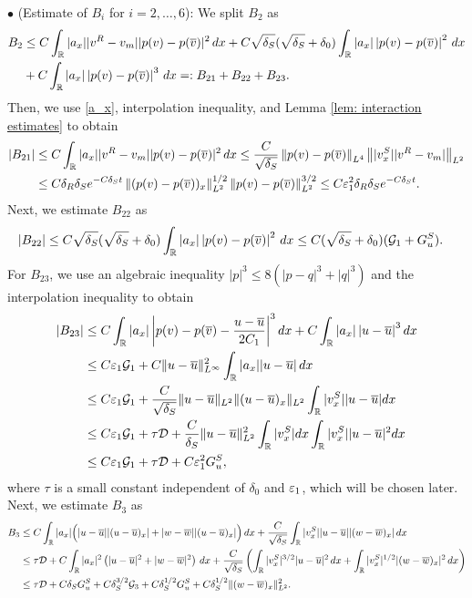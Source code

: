 \documentclass[11pt,reqno]{amsart}
\begin{document}
\noindent $\bullet$ (Estimate of  $B_i$ for $i=2,\ldots, 6$):  We split $B_2$ as 
\begin{align*}
    B_2 &\le C \int_\mathbb{R} |a_x| |v^R-v_m||p(v)-p(\overline{v})|^2\, dx +C \sqrt{\delta_S}(\sqrt{\delta_S}+\delta_0)\int_{\mathbb{R}} |a_x| \left|p(v)-p(\overline{v})\right|^2 \, dx \\ 
    &+ C\int_{\mathbb{R}} |a_x| \left|p(v)-p(\overline{v})\right|^3 \, dx =:B_{21}+B_{22}+B_{23}.
\end{align*}
Then, we use \eqref{a_x}, interpolation inequality, and Lemma \ref{lem: interaction estimates} to obtain
    \begin{align*}
    |B_{21}| &\le C \int_\mathbb{R} |a_x| |v^R-v_m||p(v)-p(\overline{v})|^2\, dx\le \frac{C}{\sqrt{\delta_S}}  \left\lVert p(v)-p(\overline{v})\right\rVert_{L^4} \left\lVert|v^S_x||v^R-v_m|\right\rVert_{L^2} \\ 
    &\le C \delta_R \delta_S e^{-C \delta_S t} \left\lVert(p(v)-p(\overline{v}))_x\right\rVert_{L^2}^{1/2} \left\lVert p(v)-p(\overline{v})\right\rVert_{L^2}^{3/2}  \le C  \varepsilon_1^2 \delta_R \delta_S e^{-C \delta_S t}.
    \end{align*}
    Next, we estimate $B_{22}$ as
    \begin{align*}
    |B_{22}|&\le C \sqrt{\delta_S}(\sqrt{\delta_S}+\delta_0)\int_{\mathbb{R}} |a_x| \left|p(v)-p(\overline{v})\right|^2 \, dx \le C (\sqrt{\delta_S}+\delta_0)(\mathcal{G}_1+G^S_u).
    \end{align*}
  For $B_{23}$, we use an algebraic inequality $|p|^3\le 8(|p-q|^3+|q|^3)$ and the interpolation inequality to obtain
    \begin{align*}
    |B_{23}|&\le C\int_{\mathbb{R}} |a_x| \left|p(v)-p(\overline{v})-\frac{u-\overline{u}}{2C_1}\right|^3dx+C\int_{\mathbb{R}} |a_x| \left|u-\overline{u}\right|^3dx \\
    &\le C\varepsilon_1\mathcal{G}_1+C\lVert u-\overline{u} \rVert_{L^\infty}^2 \int_{\mathbb{R}} |a_x||u-\overline{u}| \,dx\\
    &\le C\varepsilon_1\mathcal{G}_1+\frac{C}{\sqrt{\delta_S}} \lVert u-\overline{u} \rVert_{L^2}\lVert (u-\overline{u})_x \rVert_{L^2}\int_{\mathbb{R}} |v^S_x| |u-\overline{u}|dx \\
    &\le C\varepsilon_1\mathcal{G}_1+\tau\mathcal{D}+\frac{C}{\delta_S}\lVert u-\overline{u} \rVert_{L^2}^2 \int_{\mathbb{R}} |v^S_x| dx\int_{\mathbb{R}} |v^S_x| |u-\overline{u}|^2 dx \\
    &\le C\varepsilon_1\mathcal{G}_1+\tau\mathcal{D}+C\varepsilon_1^2G^S_u,
    \end{align*}
	where $\tau$ is a small constant independent of $\delta_0$ and $\varepsilon_1$, which will be chosen later. Next, we estimate $B_3$ as
    \begin{align*}
         B_3
         &\le  C \int_\mathbb{R} |a_x| \Big( |u-\overline{u}| |(u-\overline{u})_x|+ |w-\overline{w}| |(u-\overline{u})_x|   \Big) \, dx + \frac{C}{\sqrt{\delta_S}} \int_\mathbb{R} |v^S_x| |u-\overline{u}| |(w-\overline{w})_x| \, dx \\
         &\le \tau \mathcal{D} + C \int_\mathbb{R} |a_x|^2 \left( |u-\overline{u}|^2+ |w-\overline{w}|^2 \right) \, dx +  \frac{C}{\sqrt{\delta_S}} \left( \int_\mathbb{R} |v^S_x|^{3/2} |u-\overline{u}|^2 \, dx + \int_\mathbb{R} |v^S_x|^{1/2} |(w-\overline{w})_x|^2 \, dx \right) \\ 
    &\le \tau\mathcal{D} + C \delta_S G^S_u + C \delta_S^{3/2} \mathcal{G}_3 +  C \delta_S^{1/2} G^S_u + C \delta_S^{1/2}  \|(w-\overline{w})_x\|_{L^2}^2.
    \end{align*}
\end{document}
